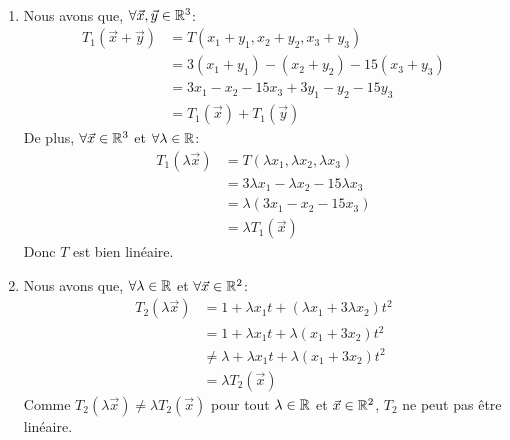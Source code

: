 \begin{exercice}
\,
\begin{enumerate}
    \item Nous avons que, $\forall \vec{x}, \vec{y} \in \mathbb{R}^3$:
        \begin{align*}
            T_1(\vec{x} + \vec{y}) &= T(x_1 + y_1, x_2 + y_2, x_3 + y_3) \\
            &= 3(x_1 + y_1) - (x_2 + y_2) -15(x_3 + y_3) \\
            &= 3x_1 - x_2 -15x_3 + 3y_1 -y_2 -15y_3 \\
            &= T_1(\vec{x}) + T_1(\vec{y})
        \end{align*}
        De plus, $\forall \vec{x} \in \mathbb{R}^3$ et $\forall \lambda \in \mathbb{R}$:
        \begin{align*}
            T_1(\lambda \vec{x}) &= T(\lambda x_1, \lambda x_2, \lambda x_3) \\
            &= 3\lambda x_1 - \lambda x_2 -15 \lambda x_3 \\
            &= \lambda(3x_1 - x_2 -15x_3) \\
            &= \lambda T_1(\vec{x})
        \end{align*}
        Donc $T$ est bien linéaire.

    \item Nous avons que, $\forall \lambda \in \mathbb{R}$ et $\forall \vec{x} \in \mathbb{R}^2$:
    \begin{align*}
        T_2(\lambda \vec{x}) &= 1 + \lambda x_1 t + (\lambda x_1 + 3\lambda x_2)t^2 \\
        &= 1 + \lambda x_1 t + \lambda(x_1 + 3x_2)t^2 \\
        &\neq \lambda + \lambda x_1 t + \lambda(x_1 + 3x_2)t^2 \\
        &= \lambda T_2(\vec{x})
    \end{align*}
    Comme $T_2(\lambda \vec{x}) \neq \lambda T_2(\vec{x})$ pour tout $\lambda \in \mathbb{R}$ et $\vec{x} \in \mathbb{R}^2$, $T_2$ ne peut pas être linéaire.
    

\end{enumerate}
\end{exercice}
